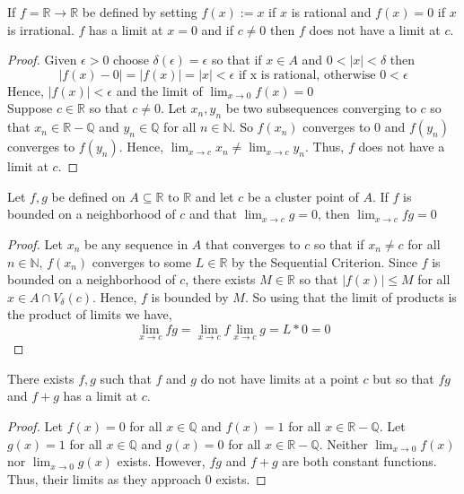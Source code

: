 \documentclass[12pt]{article}
\newcommand{\N}{\mathbb{N}}
\newcommand{\R}{\mathbb{R}}
\newenvironment{claim}[2][Claim]{\begin{trivlist}
		\item[\hskip \labelsep {\bfseries #1}\hskip \labelsep {\bfseries #2}]}{\end{trivlist}}
\begin{document}
\begin{claim}{4.1.15}
	If $f = \R \rightarrow \R$ be defined by setting $f(x) := x$ if $x$ is rational and $f(x) = 0$ if $x$ is irrational.
	$f$ has a limit at $x = 0$ and if $c \neq 0$ then $f$ does not have a limit at $c$. 
\end{claim}
\begin{proof}
	Given $\epsilon > 0$ choose $\delta(\epsilon) = \epsilon $ so that if $x \in A$ and $0 < |x| < \delta$ then
	\[
	|f(x) - 0| = |f(x)| = |x| < \epsilon \text { if x is rational, otherwise } 0 < \epsilon 
	\]
	Hence, $|f(x)| < \epsilon$ and the limit of $\lim_{x \rightarrow 0} f(x) = 0$ \\
	Suppose $c \in \R$ so that $c \neq 0$. Let $x_n, y_n$ be two subsequences converging to $c$ so that $x_n \in \R - \mathbb{Q}$ and $y_n \in \mathbb{Q}$ for all $n \in \N$. So $f(x_n)$ converges to $0$ and $f(y_n)$ converges to $f(y_n)$. Hence, $\lim_{x \rightarrow c} x_n \neq \lim_{x \rightarrow c} y_n$. Thus, $f$ does not have a limit at $c$.
\end{proof}

\begin{claim}{4.2.5}
	Let $f,g$ be defined on $A \subseteq \R \text{ to } \R$ and let $c$ be a cluster point of $A$. If $f$ is bounded on a neighborhood of $c$ and that $\lim_{x \rightarrow c} g = 0$, then $\lim_{x \rightarrow c} fg = 0$
\end{claim}
\begin{proof}
	Let $x_n$ be any sequence in $A$ that converges to $c$ so that if $x_n \neq c$ for all $n \in \N$, $f(x_n) $ converges to some $L \in \R$ by the Sequential Criterion. Since $f$ is bounded on a neighborhood of $c$, there exists $M \in \R$ so that $|f(x) | \leq M$ for all $x \in A \cap V_{\delta}(c)$. Hence, $f$ is bounded by $M$. So using that the limit of products is the product of limits we have,
	\[
	\lim_{x \rightarrow c} fg = \lim_{x \rightarrow c} f \lim_{x \rightarrow c} g = L * 0 = 0
	\] 
\end{proof}

\begin{claim}{4.2.10}
	There exists $f,g$ such that $f$ and $g$ do not have limits at a point $c$ but so that $fg$ and $f + g$ has a limit at $c$. 	
\end{claim}
\begin{proof}
	Let $f(x) = 0$ for all $x \in \mathbb{Q}$ and $f(x) = 1$ for all $x \in \R - \mathbb{Q}$. Let $g(x) = 1$ for all $x \in \mathbb{Q}$ and $g(x) = 0$ for all $x \in \R - \mathbb{Q}$. Neither $\lim_{x \rightarrow 0} f(x)$ nor $\lim_{x \rightarrow 0} g(x)$ exists. However, $fg$ and $f + g$ are both constant functions. Thus, their limits as they approach $0$ exists.
\end{proof}
\end{document}
